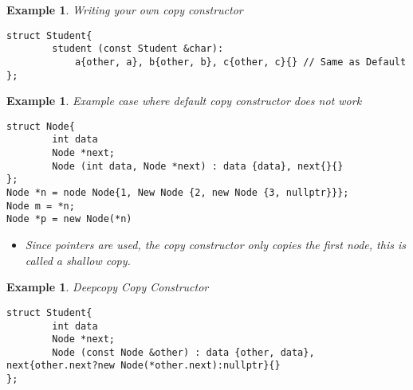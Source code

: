 \documentclass{article}
\newtheorem{ex}[theorem]{Example}
\begin{document}
\begin{ex} Writing your own copy constructor 
\begin{lstlisting}
struct Student{
		student (const Student &char):
			a{other, a}, b{other, b}, c{other, c}{}	// Same as Default
};
\end{lstlisting}
\end{ex}

\begin{ex} Example case where default copy constructor does not work
\begin{lstlisting}
struct Node{
		int data
		Node *next;
		Node (int data, Node *next) : data {data}, next{}{}
};
Node *n = node Node{1, New Node {2, new Node {3, nullptr}}};
Node m = *n;
Node *p = new Node(*n)
\end{lstlisting}
\begin{itemize}
\item Since pointers are used, the copy constructor only copies the first node, this is called a shallow copy.
\end{itemize}
\end{ex}

\begin{ex} Deepcopy Copy Constructor 
\begin{lstlisting}
struct Student{
		int data
		Node *next;
		Node (const Node &other) : data {other, data}, next{other.next?new Node(*other.next):nullptr}{}
};
\end{lstlisting}

\end{ex}
\end{document}
